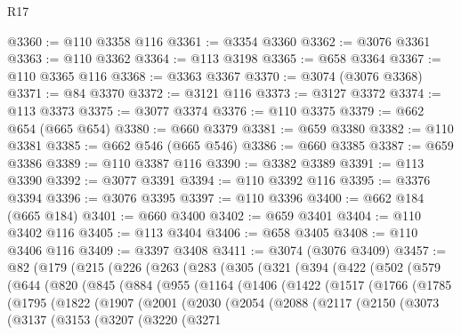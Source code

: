 \begin{lexlean}{R17}
\begin{coremodule}
{{{{{{{{{{{{{{{{{{{{{{{{{{{{{{{{{{{{{{{{{{{{{{{{{{{{{{{{{{{{{{{{{{{{{{{{{{{{{{{{{{{{{@3360 := @110 @3358 @116
@3361 := @3354 @3360
@3362 := @3076 @3361
@3363 := @110 @3362
@3364 := @113 @3198
@3365 := @658 @3364
@3367 := @110 @3365 @116
@3368 := @3363 @3367
@3370 := @3074 (@3076 @3368)
@3371 := @84 @3370
@3372 := @3121 @116
@3373 := @3127 @3372
@3374 := @113 @3373
@3375 := @3077 @3374
@3376 := @110 @3375
@3379 := @662 @654 (@665 @654)
@3380 := @660 @3379
@3381 := @659 @3380
@3382 := @110 @3381
@3385 := @662 @546 (@665 @546)
@3386 := @660 @3385
@3387 := @659 @3386
@3389 := @110 @3387 @116
@3390 := @3382 @3389
@3391 := @113 @3390
@3392 := @3077 @3391
@3394 := @110 @3392 @116
@3395 := @3376 @3394
@3396 := @3076 @3395
@3397 := @110 @3396
@3400 := @662 @184 (@665 @184)
@3401 := @660 @3400
@3402 := @659 @3401
@3404 := @110 @3402 @116
@3405 := @113 @3404
@3406 := @658 @3405
@3408 := @110 @3406 @116
@3409 := @3397 @3408
@3411 := @3074 (@3076 @3409)
@3457 := @82
    (@179
      (@215
        (@226
          (@263
            (@283
              (@305
                (@321
                  (@394
                    (@422
                      (@502
                        (@579
                          (@644
                            (@820
                              (@845
                                (@884
                                  (@955
                                    (@1164
                                      (@1406
                                        (@1422
                                          (@1517
                                            (@1766
                                              (@1785
                                                (@1795
                                                  (@1822
                                                    (@1907
                                                      (@2001
                                                        (@2030
                                                          (@2054
                                                            (@2088
                                                              (@2117
                                                                (@2150
                                                                  (@3073
                                                                    (@3137
                                                                      (@3153
                                                                        (@3207
                                                                          (@3220
                                                                            (@3271
}}}}}}}}}}}}}}}}}}}}}}}}}}}}}}}}}}}}}}}}}}}}}}}}}}}}}}}}}}}}}}}}}}}}}}}}}}}}}}}}}}}}}
\end{coremodule}
\end{lexlean}
